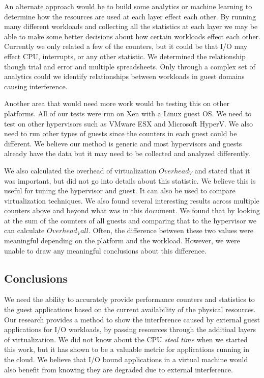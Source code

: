 An alternate approach would be to build some analytics or machine learning to determine how the resources are used at each layer effect each other.  By running many different workloads and collecting all the statistics at each layer we may be able to make some better decisions about how certain workloads effect each other.  Currently we only related a few of the counters, but it could be that I/O may effect CPU, interrupts, or any other statistic.  We determined the relationship though trial and error and multiple spreadsheets.  Only through a complex set of analytics could we identify relationships between workloads in guest domains causing interference.

Another area that would need more work would be testing this on other platforms.  All of our tests were run on Xen with a Linux guest OS.  We need to test on other hypervisors such as VMware ESX and Microsoft HyperV.  We also need to run other types of guests since the counters in each guest could be different.  We believe our method is generic and most hypervisors and guests already have the data but it may need to be collected and analyzed differently.

We also calculated the overhead of virtualization $Overhead_V$ and stated that it was important, but did not go into details about this statistic.  We believe this is useful for tuning the hypervisor and guest.  It can also be used to compare virtualization techniques.  We also found several interesting results across multiple counters above and beyond what was in this document.  We found that by looking at the sum of the counters of all guests and comparing that to the hypervisor we can calculate $Overhead_Vall$.  Often, the difference between these two values were meaningful depending on the platform and the workload.  However, we were unable to draw any meaningful conclusions about this difference. 


\subsection{Conclusions}
We need the ability to accurately provide performance counters and statistics to the guest applications based on the current availability of the physical resources.  Our research provides a method to show the interference caused by external guest applications for I/O workloads, by passing resources through the additioal layers of virtualization.  We did not know about the CPU \emph{steal time} when we started this work, but it has shown to be a valuable metric for applications running in the cloud.  We believe that I/O bound applications in a virtual machine would also benefit from knowing they are degraded due to external interference.  
